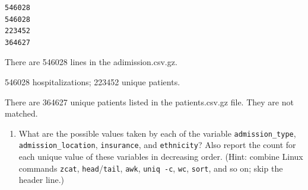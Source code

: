 \documentclass[
]{article}
\newenvironment{Shaded}{\begin{snugshade}}{\end{snugshade}}
\newcommand{\AttributeTok}[1]{\textcolor[rgb]{0.40,0.45,0.13}{#1}}
\newcommand{\DataTypeTok}[1]{\textcolor[rgb]{0.68,0.00,0.00}{#1}}
\newcommand{\FunctionTok}[1]{\textcolor[rgb]{0.28,0.35,0.67}{#1}}
\newcommand{\KeywordTok}[1]{\textcolor[rgb]{0.00,0.23,0.31}{#1}}
\newcommand{\NormalTok}[1]{\textcolor[rgb]{0.00,0.23,0.31}{#1}}
\newcommand{\StringTok}[1]{\textcolor[rgb]{0.13,0.47,0.30}{#1}}
\providecommand{\tightlist}{%
  \setlength{\itemsep}{0pt}\setlength{\parskip}{0pt}}\usepackage{longtable,booktabs,array}
\begin{document}
\begin{Shaded}
\end{Shaded}

\begin{verbatim}
546028
546028
223452
364627
\end{verbatim}

There are 546028 lines in the adimission.csv.gz.

546028 hospitalizations; 223452 unique patients.

There are 364627 unique patients listed in the patients.csv.gz file.
They are not matched.

\begin{enumerate}
\def\labelenumi{\arabic{enumi}.}
\setcounter{enumi}{5}
\tightlist
\item
  What are the possible values taken by each of the variable
  \texttt{admission\_type}, \texttt{admission\_location},
  \texttt{insurance}, and \texttt{ethnicity}? Also report the count for
  each unique value of these variables in decreasing order. (Hint:
  combine Linux commands \texttt{zcat}, \texttt{head}/\texttt{tail},
  \texttt{awk}, \texttt{uniq\ -c}, \texttt{wc}, \texttt{sort}, and so
  on; skip the header line.)
\end{enumerate}
\end{document}
